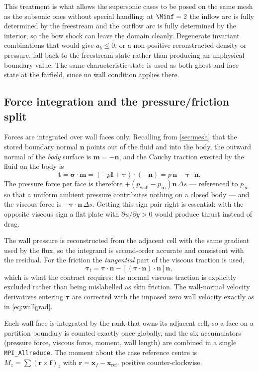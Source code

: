 This treatment is what allows the supersonic cases to be posed on the same mesh
as the subsonic ones without special handling: at $\Minf=2$ the inflow arc is
fully determined by the freestream and the outflow arc is fully determined by the
interior, so the bow shock can leave the domain cleanly. Degenerate invariant
combinations that would give $a_b\le0$, or a non-positive reconstructed density or
pressure, fall back to the freestream state rather than producing an unphysical
boundary value. The same characteristic state is used as both ghost and face
state at the farfield, since no wall condition applies there.

\subsection{Force integration and the pressure/friction split}
\label{sec:forces}

Forces are integrated over wall faces only. Recalling from \cref{sec:mesh} that
the stored boundary normal $\mathbf{n}$ points out of the fluid and into the
body, the outward normal of the \emph{body} surface is $\mathbf{m}=-\mathbf{n}$,
and the Cauchy traction exerted by the fluid on the body is
\begin{equation}
  \mathbf{t}=\boldsymbol{\sigma}\!\cdot\!\mathbf{m}
  =\left(-p\mathbf{I}+\boldsymbol{\tau}\right)\!\cdot\!(-\mathbf{n})
  =p\,\mathbf{n}-\boldsymbol{\tau}\!\cdot\!\mathbf{n}.
  \label{eq:traction}
\end{equation}
The pressure force per face is therefore $+(p_{\mathrm{wall}}-p_\infty)\mathbf{n}\,\Delta s$
--- referenced to $p_\infty$ so that a uniform ambient pressure contributes
nothing on a closed body --- and the viscous force is $-\boldsymbol{\tau}\!\cdot\!\mathbf{n}\,\Delta s$.
Getting this sign pair right is essential: with the opposite viscous sign a flat
plate with $\partial u/\partial y>0$ would produce thrust instead of drag.

The wall pressure is reconstructed from the adjacent cell with the same gradient
used by the flux, so the integrand is second-order accurate and consistent with
the residual. For the friction the \emph{tangential} part of the viscous
traction is used,
\begin{equation}
  \boldsymbol{\tau}_t=\boldsymbol{\tau}\!\cdot\!\mathbf{n}
  -\left[(\boldsymbol{\tau}\!\cdot\!\mathbf{n})\!\cdot\!\mathbf{n}\right]\mathbf{n},
  \label{eq:shear}
\end{equation}
which is what the contract requires: the normal viscous traction is explicitly
excluded rather than being mislabelled as skin friction. The wall-normal velocity
derivatives entering $\boldsymbol{\tau}$ are corrected with the imposed zero wall
velocity exactly as in \cref{eq:wallgrad}.

Each wall face is integrated by the rank that owns its adjacent cell, so a face on
a partition boundary is counted exactly once globally, and the six accumulators
(pressure force, viscous force, moment, wall length) are combined in a single
\texttt{MPI\_Allreduce}. The moment about the case reference centre is
$M_z=\sum (\mathbf{r}\times\mathbf{f})_z$ with
$\mathbf{r}=\mathbf{x}_f-\mathbf{x}_{\mathrm{ref}}$, positive counter-clockwise.

